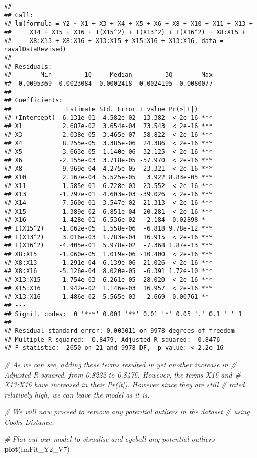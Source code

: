 \documentclass[
]{article}
\newenvironment{Shaded}{\begin{snugshade}}{\end{snugshade}}
\newcommand{\CommentTok}[1]{\textcolor[rgb]{0.56,0.35,0.01}{\textit{#1}}}
\newcommand{\KeywordTok}[1]{\textcolor[rgb]{0.13,0.29,0.53}{\textbf{#1}}}
\newcommand{\NormalTok}[1]{#1}
\begin{document}
\begin{verbatim}
## 
## Call:
## lm(formula = Y2 ~ X1 + X3 + X4 + X5 + X6 + X8 + X10 + X11 + X13 + 
##     X14 + X15 + X16 + I(X15^2) + I(X13^2) + I(X16^2) + X8:X15 + 
##     X8:X13 + X8:X16 + X13:X15 + X15:X16 + X13:X16, data = navalDataRevised)
## 
## Residuals:
##        Min         1Q     Median         3Q        Max 
## -0.0095369 -0.0023084  0.0002418  0.0024195  0.0080077 
## 
## Coefficients:
##               Estimate Std. Error t value Pr(>|t|)    
## (Intercept)  6.131e-01  4.582e-02  13.382  < 2e-16 ***
## X1           2.687e-02  3.654e-04  73.543  < 2e-16 ***
## X3           2.038e-05  3.465e-07  58.822  < 2e-16 ***
## X4           8.255e-05  3.385e-06  24.386  < 2e-16 ***
## X5           3.663e-05  1.140e-06  32.125  < 2e-16 ***
## X6          -2.155e-03  3.718e-05 -57.970  < 2e-16 ***
## X8          -9.969e-04  4.275e-05 -23.321  < 2e-16 ***
## X10          2.167e-04  5.525e-05   3.922 8.83e-05 ***
## X11          1.585e-01  6.728e-03  23.552  < 2e-16 ***
## X13         -1.797e-01  4.603e-03 -39.026  < 2e-16 ***
## X14          7.560e-01  3.547e-02  21.313  < 2e-16 ***
## X15          1.389e-02  6.851e-04  20.281  < 2e-16 ***
## X16          1.428e-01  6.536e-02   2.184  0.02898 *  
## I(X15^2)    -1.062e-05  1.558e-06  -6.818 9.78e-12 ***
## I(X13^2)     3.016e-03  1.783e-04  16.915  < 2e-16 ***
## I(X16^2)    -4.405e-01  5.978e-02  -7.368 1.87e-13 ***
## X8:X15      -1.060e-05  1.019e-06 -10.400  < 2e-16 ***
## X8:X13       1.291e-04  6.139e-06  21.026  < 2e-16 ***
## X8:X16      -5.126e-04  8.020e-05  -6.391 1.72e-10 ***
## X13:X15     -1.754e-03  6.261e-05 -28.020  < 2e-16 ***
## X15:X16      1.942e-02  1.146e-03  16.957  < 2e-16 ***
## X13:X16      1.486e-02  5.565e-03   2.669  0.00761 ** 
## ---
## Signif. codes:  0 '***' 0.001 '**' 0.01 '*' 0.05 '.' 0.1 ' ' 1
## 
## Residual standard error: 0.003011 on 9978 degrees of freedom
## Multiple R-squared:  0.8479, Adjusted R-squared:  0.8476 
## F-statistic:  2650 on 21 and 9978 DF,  p-value: < 2.2e-16
\end{verbatim}

\begin{Shaded}
\begin{Highlighting}[]
\CommentTok{# As we can see, adding these terms resulted in yet another increase in}
\CommentTok{# Adjusted R-squared, from 0.8222 to 0.8476. However, the terms X16 and }
\CommentTok{# X13:X16 have increased in their Pr(|t|). However since they are still}
\CommentTok{# rated relatively high, we can leave the model as it is.}

\CommentTok{# We will now proceed to remove any potential outliers in the dataset}
\CommentTok{# using Cooks Distance.}

\CommentTok{# Plot out our model to visualise and eyeball any potential outliers}
\KeywordTok{plot}\NormalTok{(lmFit_Y2_V7)}
\end{Highlighting}
\end{Shaded}
\end{document}
